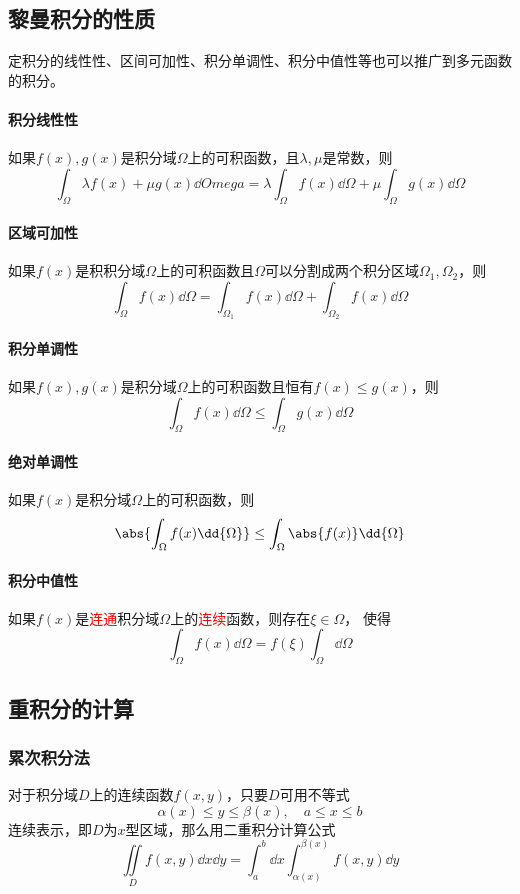 \subsection{黎曼积分的性质}
定积分的线性性、区间可加性、积分单调性、积分中值性等也可以推广到多元函数的积分。
\paragraph{积分线性性}
如果$f(x),g(x)$是积分域$\Omega$上的可积函数，且$\lambda,\mu$是常数，则
\[ \int_\Omega \lambda f(x) + \mu g(x)\dd{Omega} = \lambda\int_\Omega f(x)\dd{\Omega} + \mu\int_\Omega g(x)\dd{\Omega} \]

\paragraph{区域可加性}
如果$f(x)$是积积分域$\Omega$上的可积函数且$\Omega$可以分割成两个积分区域$\Omega_1,\Omega_2$，则
\[ \int_\Omega f(x)\dd{\Omega} = \int_{\Omega_1} f(x)\dd{\Omega} + \int_{\Omega_2} f(x)\dd{\Omega} \]

\paragraph{积分单调性}
如果$f(x),g(x)$是积分域$\Omega$上的可积函数且恒有$f(x)\leq g(x)$，则
\[ \int_\Omega f(x)\dd{\Omega} \leq \int_\Omega g(x)\dd{\Omega} \]

\paragraph{绝对单调性}
如果$f(x)$是积分域$\Omega$上的可积函数，则
\[ \abs{\int_\Omega f(x)\dd{\Omega}} \leq \int_\Omega \abs{f(x)}\dd{\Omega} \]

\paragraph{积分中值性}
如果$f(x)$是\textcolor{red}{连通}积分域$\Omega$上的\textcolor{red}{连续}函数，则存在$\xi\in\Omega$，
使得
\[ \int_\Omega f(x)\dd{\Omega} = f(\xi)\int_\Omega \dd\Omega \]

\subsection{重积分的计算}
\subsubsection{累次积分法}
对于积分域$D$上的连续函数$f(x,y)$，只要$D$可用不等式
\[ \alpha(x)\leq y \leq \beta(x),\quad a\leq x \leq b \]
连续表示，即$D$为$x$型区域，那么用二重积分计算公式
\begin{equation}
    \iint\limits_D f(x,y)\dd{x}\dd{y} =\int_a^b \dd{x}\int_{\alpha(x)}^{\beta(x)} f(x,y)\dd{y}
\end{equation}

